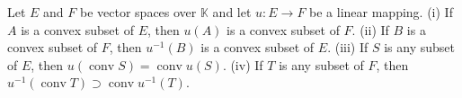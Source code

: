 Let $E$ and $F$ be vector spaces over $\mathbb{K}$ and let $u: E \rightarrow F$ be a linear mapping. (i) If $A$ is a convex subset of $E$, then $u(A)$ is a convex subset of $F$. (ii) If $B$ is a convex subset of $F$, then $u^{-1}(B)$ is a convex subset of $E$. (iii) If $S$ is any subset of $E$, then $u(\operatorname{conv} S) = \operatorname{conv} u(S)$. (iv) If $T$ is any subset of $F$, then $u^{-1}(\operatorname{conv} T) \supset \operatorname{conv} u^{-1}(T)$.
